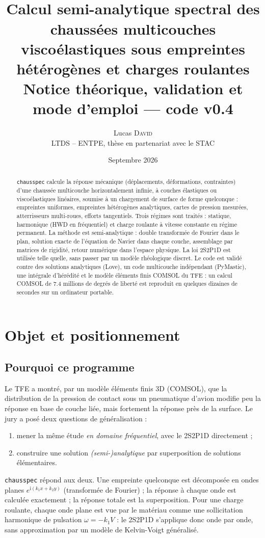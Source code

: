 \documentclass[11pt,a4paper]{article}
\title{\textbf{\cs}\\[4pt]\large Calcul semi-analytique spectral des chaussées multicouches\\
viscoélastiques sous empreintes hétérogènes et charges roulantes\\[8pt]
\normalsize Notice théorique, validation et mode d'emploi --- code v0.4}
\author{Lucas \textsc{David}\\ \small LTDS -- ENTPE, thèse en partenariat avec le STAC}
\date{Septembre 2026}
\newcommand{\ii}{\mathrm{i}}
\newcommand{\cs}{\texttt{chausspec}}
\begin{document}
\sloppy
\maketitle

\begin{abstract}
\cs{} calcule la réponse mécanique (déplacements, déformations, contraintes) d'une chaussée
multicouche horizontalement infinie, à couches élastiques ou viscoélastiques linéaires, soumise à
un chargement de surface de forme quelconque : empreintes uniformes, empreintes hétérogènes
analytiques, cartes de pression mesurées, atterrisseurs multi-roues, efforts tangentiels. Trois
régimes sont traités : statique, harmonique (HWD en fréquentiel) et charge roulante à vitesse
constante en régime permanent. La méthode est semi-analytique : double transformée de Fourier dans
le plan, solution exacte de l'équation de Navier dans chaque couche, assemblage par matrices de
rigidité, retour numérique dans l'espace physique. La loi 2S2P1D est utilisée telle quelle, sans
passer par un modèle rhéologique discret. Le code est validé contre des solutions analytiques
(Love), un code multicouche indépendant (PyMastic), une intégrale d'hérédité et le modèle
éléments finis COMSOL du TFE : un calcul COMSOL de \num{7.4} millions de degrés de liberté est
reproduit en quelques dizaines de secondes sur un ordinateur portable.
\end{abstract}

\tableofcontents
\newpage

\section{Objet et positionnement}
\subsection{Pourquoi ce programme}
Le TFE a montré, par un modèle éléments finis 3D (COMSOL), que la distribution de la pression de
contact sous un pneumatique d'avion modifie peu la réponse en base de couche liée, mais fortement
la réponse près de la surface. Le jury a posé deux questions de généralisation :
\begin{enumerate}[nosep]
  \item mener la même étude \emph{en domaine fréquentiel}, avec le 2S2P1D directement ;
  \item construire une solution \emph{(semi-)analytique} par superposition de solutions élémentaires.
\end{enumerate}
\cs{} répond aux deux. Une empreinte quelconque est décomposée en ondes planes $e^{\ii(k_1x+k_2y)}$
(transformée de Fourier) ; la réponse à chaque onde est calculée exactement ; la réponse totale est
la superposition. Pour une charge roulante, chaque onde plane est vue par le matériau comme une
sollicitation harmonique de pulsation $\omega=-k_1V$ : le 2S2P1D s'applique donc onde par onde, sans
approximation par un modèle de Kelvin-Voigt généralisé.
\end{document}
